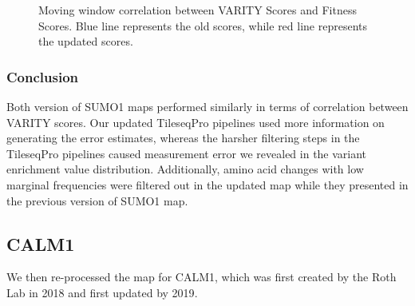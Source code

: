 \documentclass{article}
\begin{document}
\begin{figure}[H]%
    \centering
    \qquad
    \caption{Moving window correlation between VARITY Scores and Fitness Scores. Blue line represents the old scores, while red line represents the updated scores.}%
    \label{fig:VARITY_SUMO}%
\end{figure}
\subsubsection{Conclusion}
Both version of SUMO1 maps performed similarly in terms of correlation between VARITY scores. Our updated TileseqPro pipelines used more information on generating the error estimates, whereas the harsher filtering steps in the TileseqPro pipelines caused measurement error we revealed in the variant enrichment value distribution. Additionally, amino acid changes with low marginal frequencies were filtered out in the updated map while they presented in the previous version of SUMO1 map.


\subsection{CALM1}
We then re-processed the map for CALM1, which was first created by the Roth Lab in 2018 and first updated by 2019\cite{floyd_proactive_2023}.
\end{document}
